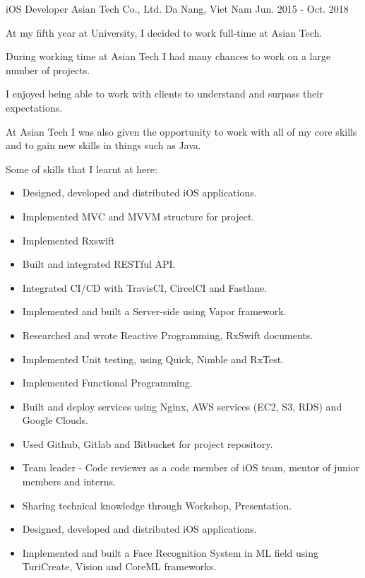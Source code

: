 \begin{cventries}
  \cventry
    {iOS Developer} %
    {Asian Tech Co., Ltd.} %
    {Da Nang, Viet Nam} %
    {Jun. 2015 - Oct. 2018} %
    {
      \begin{cvitems} %
        \item {At my fifth year at University, I decided to work full-time at Asian Tech.}
        \item {During working time at Asian Tech I had many chances to work on a large number of projects.}
        \item {I enjoyed being able to work with clients to understand and surpass their expectations.}
        \item {At Asian Tech I was also given the opportunity to work with all of my core skills and to gain new skills in things such as Java.}
        \item {Some of skills that I learnt at here:}
          \begin{itemize}
            \item Designed, developed and distributed iOS applications.
            \item Implemented MVC and MVVM structure for project.
            \item Implemented Rxswift
            \item Built and integrated RESTful API.
            \item Integrated CI/CD with TravisCI, CircelCI and Fastlane.
            \item Implemented and built a Server-side using Vapor framework.
            \item Researched and wrote Reactive Programming, RxSwift documents.
            \item Implemented Unit testing, using Quick, Nimble and RxTest.
            \item Implemented Functional Programming.
            \item Built and deploy services using Nginx, AWS services (EC2, S3, RDS) and Google Clouds.
            \item Used Github, Gitlab and Bitbucket for project repository.
            \item Team leader - Code reviewer as a code member of iOS team, mentor of junior members and interns.
            \item Sharing technical knowledge through Workshop, Presentation.
            \item Designed, developed and distributed iOS applications.
            \item Implemented and built a Face Recognition System in ML field using TuriCreate, Vision and CoreML frameworks.
          \end{itemize}
      \end{cvitems}
    }


\end{cventries}
